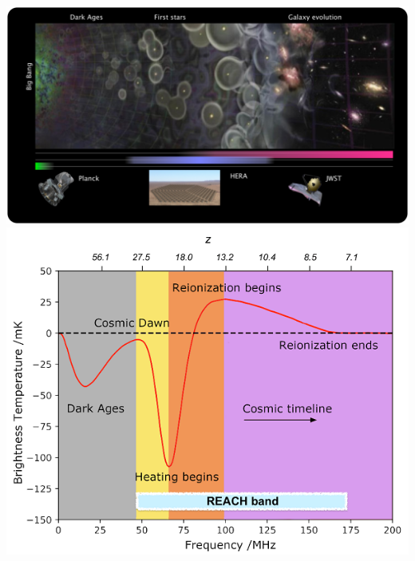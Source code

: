 \documentclass[aspectratio=169]{beamer}
\begin{document}
\begin{frame}
\begin{columns}
        \includegraphics[width=\textwidth]{figures/21cm_1.png}
        \includegraphics[width=\textwidth]{figures/21cm.png}


    \end{columns}

\end{frame}
\end{document}
